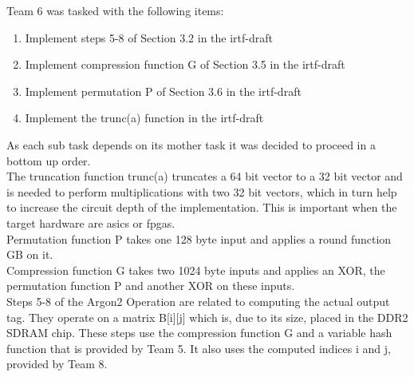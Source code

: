 Team 6 was tasked with the following items: 

\begin{enumerate}
\item Implement steps 5-8 of Section 3.2 in the irtf-draft \autocite{irtf-draft}
\item Implement compression function G of Section 3.5 in the irtf-draft \autocite{irtf-draft}
\item Implement permutation P of Section 3.6 in the irtf-draft \autocite{irtf-draft}
\item Implement the trunc(a) function in the irtf-draft \autocite{irtf-draft}
\end{enumerate}

As each sub task depends on its mother task it was decided to proceed in a bottom up
order. 
\\
The truncation function trunc(a) truncates a 64 bit vector to a 32 bit vector and 
is needed to perform multiplications with two 32 bit vectors, which in turn help to
increase the circuit depth of the implementation. This is important when the target
hardware are \glspl{asic} or \glspl{fpga}.
\\
Permutation function P takes one 128 byte input and applies a round function GB
on it.
\\
Compression function G takes two 1024 byte inputs and applies an XOR, the
permutation function P and another XOR on these inputs.
\\
Steps 5-8 of the Argon2 Operation are related to computing the actual output tag.
They operate on a matrix B[i][j] which is, due to its size, placed
in the DDR2 SDRAM chip. These steps use the compression function G and a variable 
hash function that is provided by Team 5. It also uses the computed indices i and j,
provided by Team 8. 
